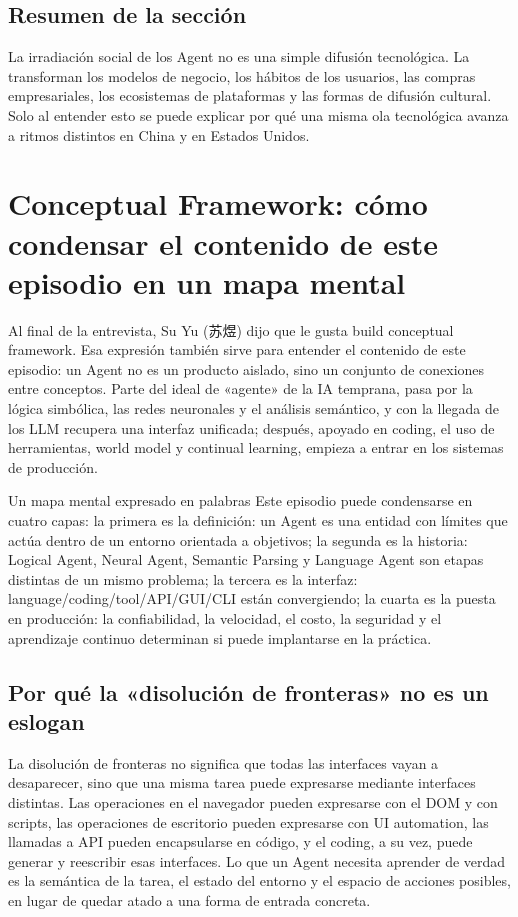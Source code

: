 \documentclass[a4paper]{article}
\begin{document}
\subsection{Resumen de la sección}

La irradiación social de los Agent no es una simple difusión tecnológica. La transforman los modelos de negocio, los hábitos de los usuarios, las compras empresariales, los ecosistemas de plataformas y las formas de difusión cultural. Solo al entender esto se puede explicar por qué una misma ola tecnológica avanza a ritmos distintos en China y en Estados Unidos.
\section{Conceptual Framework: cómo condensar el contenido de este episodio en un mapa mental}

Al final de la entrevista, Su Yu (苏煜) dijo que le gusta build conceptual framework. Esa expresión también sirve para entender el contenido de este episodio: un Agent no es un producto aislado, sino un conjunto de conexiones entre conceptos. Parte del ideal de «agente» de la IA temprana, pasa por la lógica simbólica, las redes neuronales y el análisis semántico, y con la llegada de los LLM recupera una interfaz unificada; después, apoyado en coding, el uso de herramientas, world model y continual learning, empieza a entrar en los sistemas de producción.

\begin{importantbox}{Un mapa mental expresado en palabras}
Este episodio puede condensarse en cuatro capas: la primera es la definición: un Agent es una entidad con límites que actúa dentro de un entorno orientada a objetivos; la segunda es la historia: Logical Agent, Neural Agent, Semantic Parsing y Language Agent son etapas distintas de un mismo problema; la tercera es la interfaz: language/coding/tool/API/GUI/CLI están convergiendo; la cuarta es la puesta en producción: la confiabilidad, la velocidad, el costo, la seguridad y el aprendizaje continuo determinan si puede implantarse en la práctica.
\end{importantbox}

\subsection{Por qué la «disolución de fronteras» no es un eslogan}

La disolución de fronteras no significa que todas las interfaces vayan a desaparecer, sino que una misma tarea puede expresarse mediante interfaces distintas. Las operaciones en el navegador pueden expresarse con el DOM y con scripts, las operaciones de escritorio pueden expresarse con UI automation, las llamadas a API pueden encapsularse en código, y el coding, a su vez, puede generar y reescribir esas interfaces. Lo que un Agent necesita aprender de verdad es la semántica de la tarea, el estado del entorno y el espacio de acciones posibles, en lugar de quedar atado a una forma de entrada concreta.
\end{document}

